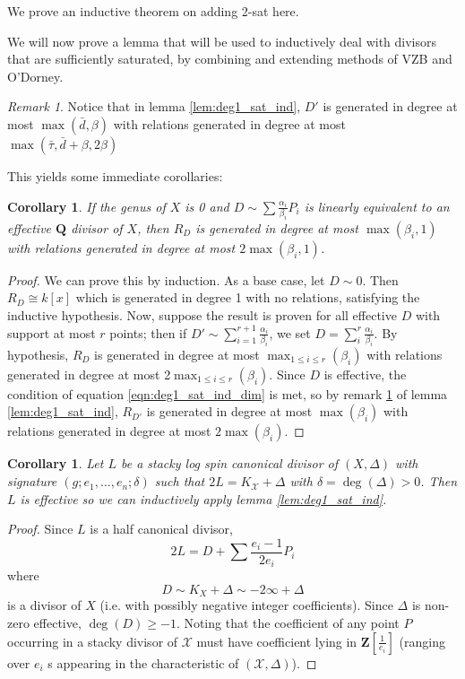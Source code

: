 \documentclass{amsart}
\theoremstyle{plain}
\newtheorem{cor}[thm]{Corollary}
\theoremstyle{definition}
\theoremstyle{remark}
\newtheorem{rem}[thm]{Remark}
\numberwithin{equation}{section}
\newcommand \sx{\mathscr X}
\newcommand \subhalf[1]{\frac{{#1} - 1}{2{#1}}}
\newcommand \halfcan{L}
\begin{document}
{We prove an inductive theorem on adding 2-sat here.


We will now prove a lemma that will be used to inductively deal with divisors that are sufficiently saturated, by combining and extending methods of VZB  and O'Dorney.

\begin{rem}\label{rem:deg1_sat_ind_gen_rel_degrees}
Notice that in lemma \ref{lem:deg1_sat_ind}, $D'$ is generated in degree at most $\max(\bar{d}, \beta)$ with relations generated in degree at most $\max(\bar{\tau}, \bar{d} + \beta, 2 \beta)$
\end{rem}

This yields some immediate corollaries:

\begin{cor}\label{cor:effective_Q_divisor_can_ring}
If the genus of $X$ is 0 and $D\sim\sum \frac{\alpha_i}{\beta_i} P_i$ is linearly equivalent to an effective $\mathbf{Q}$ divisor of $X$, then $R_D$ is generated in degree at most $\max(\beta_i,1)$ with relations generated in degree at most $2\max(\beta_i,1)$.
\end{cor}

\begin{proof}
We can prove this by induction.  As a base case, let $D\sim 0$.  Then $R_D\cong k[x]$ which is generated in degree 1 with no relations, satisfying the inductive hypothesis.
Now, suppose the result is proven for all effective $D$ with support at most $r$ points; then if $D'\sim \sum_{i=1}^{r+1} \frac{\alpha_i}{\beta_i}$, we set $D=\sum_i^{r} \frac{\alpha_i}{\beta_i}$.  By hypothesis, $R_D$ is generated in degree at most $\max_{1\le i\le r}(\beta_i)$ with relations generated in degree at most 2$\max_{1\le i\le r}(\beta_i)$.  Since $D$ is effective, the condition of equation \ref{eqn:deg1_sat_ind_dim} is met, so by remark \ref{rem:deg1_sat_ind_gen_rel_degrees} of lemma \ref{lem:deg1_sat_ind}, $R_{D'}$ is generated in degree at most $\max(\beta_i)$ with relations generated in degree at most $2\max(\beta_i)$.
\end{proof}


\begin{cor}\label{cor:genus_0_positive_delta}
Let $\halfcan$ be a stacky log spin canonical divisor of $(X,\Delta)$ with signature $(g;e_1,\ldots, e_n;\delta)$ such that $2\halfcan=K_\sx+\Delta$ with $\delta=\deg(\Delta)>0$.  Then $\halfcan$ is effective so we can inductively apply lemma \ref{lem:deg1_sat_ind}.
\end{cor}
\begin{proof}
Since $\halfcan$ is a half canonical divisor, 
\[
	2\halfcan=D+\sum \subhalf{e_i}P_i
\] 
where 
\[
	D\sim K_X+\Delta\sim -2\infty+ \Delta
\] is a divisor of $X$ (i.e. with 
possibly negative integer coefficients).  Since $\Delta$ is non-
zero effective, $\deg(D)\ge -1$.   Noting that the coefficient of 
any point $P$ occurring in a stacky divisor of $\sx$ must have 
coefficient lying in $\mathbf{Z}[\frac{1}{e_i}]$ (ranging over $e_i$
s appearing in the characteristic of $(\sx,\Delta)$).
 

\end{proof}}
\end{document}
